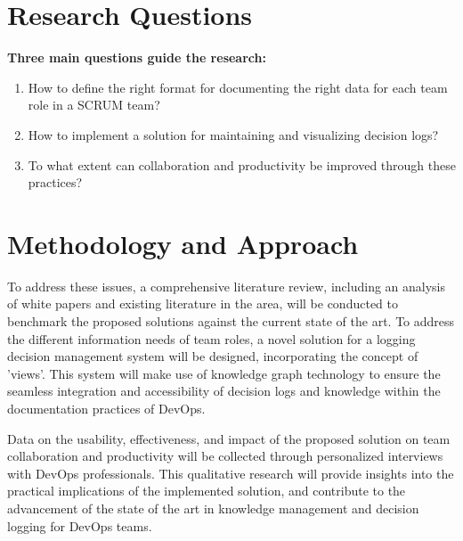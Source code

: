 
\section{Research Questions}

\textbf{Three main questions guide the research:}
\begin{enumerate}
\item How to define the right format for documenting the right data for each team role in a SCRUM team?
\item How to implement a solution for maintaining and visualizing decision logs?
\item To what extent can collaboration and productivity be improved through these practices?
\end{enumerate}


\section{Methodology and Approach}

To address these issues, a comprehensive literature review, including an analysis of white papers and existing literature in the area, will be conducted to benchmark the proposed solutions against the current state of the art. To address the different information needs of team roles, a novel solution for a logging decision management system will be designed, incorporating the concept of 'views'. This system will make use of knowledge graph technology to ensure the seamless integration and accessibility of decision logs and knowledge within the documentation practices of DevOps.

Data on the usability, effectiveness, and impact of the proposed solution on team collaboration and productivity will be collected through personalized interviews with DevOps professionals. This qualitative research will provide insights into the practical implications of the implemented solution, and contribute to the advancement of the state of the art in knowledge management and decision logging for DevOps teams.





